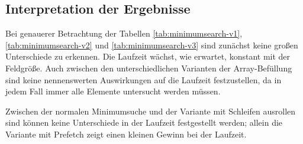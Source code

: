 \newpage

\subsection{Interpretation der Ergebnisse}

Bei genauerer Betrachtung der Tabellen \ref{tab:minimumsearch-v1}, \ref{tab:minimumsearch-v2} und \ref{tab:minimumsearch-v3} sind zunächst keine großen Unterschiede zu erkennen. Die Laufzeit wächst, wie erwartet, konstant mit der Feldgröße. Auch zwischen den unterschiedlichen Varianten der Array-Befüllung sind keine nennenswerten Auswirkungen auf die Laufzeit festzustellen, da in jedem Fall immer alle Elemente untersucht werden müssen.

Zwischen der normalen Minimumsuche und der Variante mit Schleifen ausrollen sind können keine Unterschiede in der Laufzeit festgestellt werden; allein die Variante mit Prefetch zeigt einen kleinen Gewinn bei der Laufzeit.
\newpage